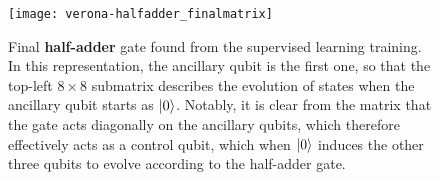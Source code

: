 \begin{figure}
    \centering
    \texttt{[image: verona-halfadder\_finalmatrix]}
    \caption{
        Final \textbf{half-adder} gate found from the supervised learning training.
        In this representation, the ancillary qubit is the first one, so that the top-left $8\times8$ submatrix describes the evolution of states when the ancillary qubit starts as $\ket0$.
        Notably, it is clear from the matrix that the gate acts diagonally on the ancillary qubits, which therefore effectively acts as a control qubit, which when $\ket0$ induces the other three qubits to evolve according to the half-adder gate.
    }
    \label{fig:GL:halfadder_finalmatrix}
\end{figure}
